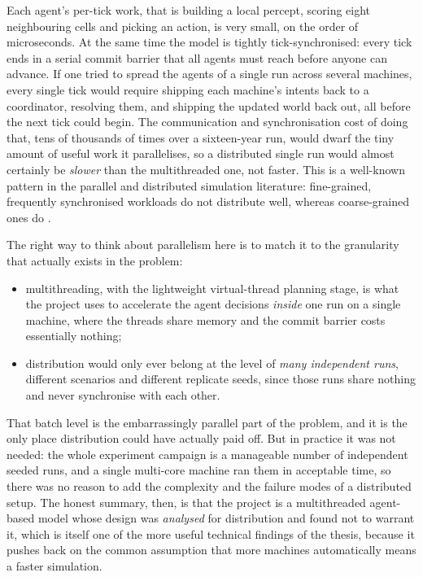 Each agent's per-tick work, that is building a local percept, scoring eight neighbouring cells and picking an action, is very small, on the order of microseconds. At the same time the model is tightly tick-synchronised: every tick ends in a serial commit barrier that all agents must reach before anyone can advance. If one tried to spread the agents of a single run across several machines, every single tick would require shipping each machine's intents back to a coordinator, resolving them, and shipping the updated world back out, all before the next tick could begin. The communication and synchronisation cost of doing that, tens of thousands of times over a sixteen-year run, would dwarf the tiny amount of useful work it parallelises, so a distributed single run would almost certainly be \emph{slower} than the multithreaded one, not faster. This is a well-known pattern in the parallel and distributed simulation literature: fine-grained, frequently synchronised workloads do not distribute well, whereas coarse-grained ones do \cite{Fujimoto2000}.

The right way to think about parallelism here is to match it to the granularity that actually exists in the problem:

\begin{itemize}
    \item multithreading, with the lightweight virtual-thread planning stage, is what the project uses to accelerate the agent decisions \emph{inside} one run on a single machine, where the threads share memory and the commit barrier costs essentially nothing;
    \item distribution would only ever belong at the level of \emph{many independent runs}, different scenarios and different replicate seeds, since those runs share nothing and never synchronise with each other.
\end{itemize}

That batch level is the embarrassingly parallel part of the problem, and it is the only place distribution could have actually paid off. But in practice it was not needed: the whole experiment campaign is a manageable number of independent seeded runs, and a single multi-core machine ran them in acceptable time, so there was no reason to add the complexity and the failure modes of a distributed setup. The honest summary, then, is that the project is a multithreaded agent-based model whose design was \emph{analysed} for distribution and found not to warrant it, which is itself one of the more useful technical findings of the thesis, because it pushes back on the common assumption that more machines automatically means a faster simulation.

